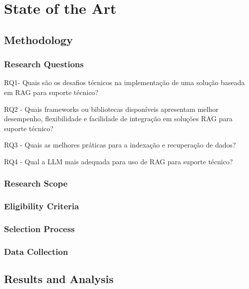 
\chapter{State of the Art} %
\label{chap:Chapter3} 

\section{Methodology}

\subsection{Research Questions}


RQ1- Quais são os desafios técnicos na implementação de uma solução baseada em RAG para suporte técnico?



RQ2 - Quais frameworks ou bibliotecas disponíveis apresentam melhor desempenho, flexibilidade e facilidade de integração em soluções RAG para suporte técnico?




RQ3 - Quais as melhores práticas para a indexação e recuperação de dados? 


RQ4 - Qual a LLM mais adequada para uso de RAG para suporte técnico? 








\subsection{Research Scope}

\subsection{Eligibility Criteria}


\subsection{Selection Process}

\subsection{Data Collection}

\section{Results and Analysis}


